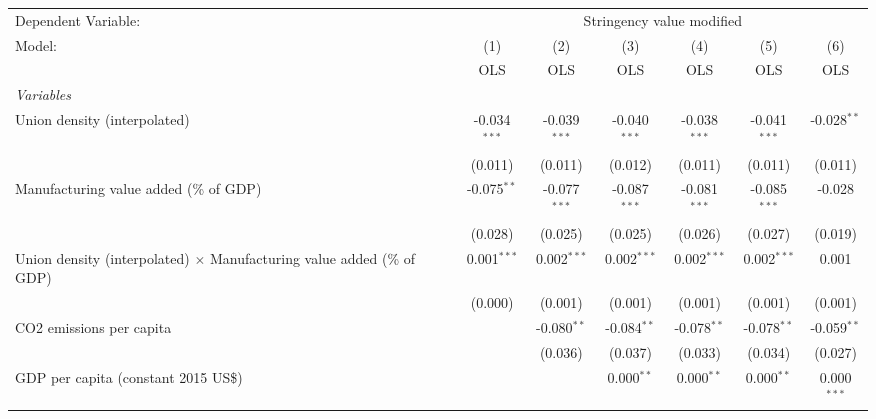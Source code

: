 
\begingroup
\centering
\begin{tabular}{lcccccc}
   \toprule
   Dependent Variable: & \multicolumn{6}{c}{Stringency value modified}\\
   Model:                                                                        & (1)            & (2)            & (3)            & (4)            & (5)            & (6)\\  
                                                                                 &  OLS           & OLS            & OLS            & OLS            & OLS            & OLS\\  
   \midrule
   \emph{Variables}\\
   Union density (interpolated)                                                  & -0.034$^{***}$ & -0.039$^{***}$ & -0.040$^{***}$ & -0.038$^{***}$ & -0.041$^{***}$ & -0.028$^{**}$\\   
                                                                                 & (0.011)        & (0.011)        & (0.012)        & (0.011)        & (0.011)        & (0.011)\\   
   Manufacturing value added (\% of GDP)                                         & -0.075$^{**}$  & -0.077$^{***}$ & -0.087$^{***}$ & -0.081$^{***}$ & -0.085$^{***}$ & -0.028\\   
                                                                                 & (0.028)        & (0.025)        & (0.025)        & (0.026)        & (0.027)        & (0.019)\\   
   Union density (interpolated) $\times$ Manufacturing value added (\% of GDP)   & 0.001$^{***}$  & 0.002$^{***}$  & 0.002$^{***}$  & 0.002$^{***}$  & 0.002$^{***}$  & 0.001\\   
                                                                                 & (0.000)        & (0.001)        & (0.001)        & (0.001)        & (0.001)        & (0.001)\\   
   CO2 emissions per capita                                                      &                & -0.080$^{**}$  & -0.084$^{**}$  & -0.078$^{**}$  & -0.078$^{**}$  & -0.059$^{**}$\\   
                                                                                 &                & (0.036)        & (0.037)        & (0.033)        & (0.034)        & (0.027)\\   
   GDP per capita (constant 2015 US\$)                                           &                &                & 0.000$^{**}$   & 0.000$^{**}$   & 0.000$^{**}$   & 0.000$^{***}$\\   

\end{tabular}
